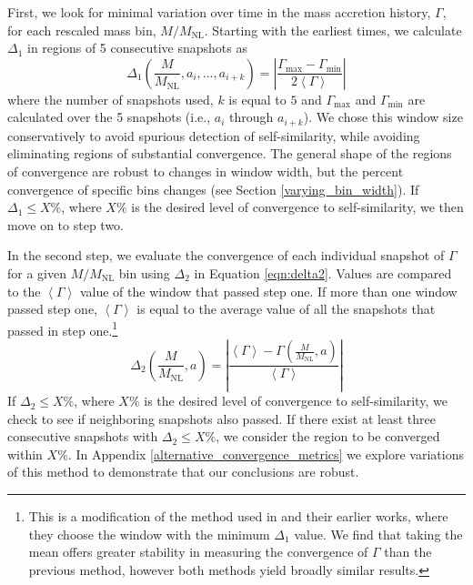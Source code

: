First, we look for minimal variation over time in the mass accretion history, $\Gamma$, for each rescaled mass bin, $M/M_{\mathrm{NL}}$. Starting with the earliest times, we calculate $\Delta_1$ in regions of 5 consecutive snapshots as
\begin{equation}\label{eqn:delta1}
    \Delta_{1}\left(\frac{M}{M_{\mathrm{NL}}}, a_{i}, ..., a_{i+k}\right) = \left|\frac{\Gamma_{\mathrm{max}} - \Gamma_{\mathrm{min}}}{2\left<\Gamma\right>}\right|
\end{equation}
where the number of snapshots used, $k$ is equal to $5$ and $\Gamma_{\mathrm{max}}$ and $\Gamma_{\mathrm{min}}$ are calculated over the 5 snapshots (i.e., $a_{i}$ through $a_{i+k}$). We chose this window size conservatively to avoid spurious detection of self-similarity, while avoiding eliminating regions of substantial convergence. The general shape of the regions of convergence are robust to changes in window width, but the percent convergence of specific bins changes (see Section \ref{varying_bin_width}). If $\Delta_1 \leq X\%$, where $X\%$ is the desired level of convergence to self-similarity, we then move on to step two.

In the second step, we evaluate the convergence of each individual snapshot of $\Gamma$ for a given $M/M_{\mathrm{NL}}$ bin using $\Delta_2$ in Equation \ref{eqn:delta2}. Values are compared to the $\left<\Gamma\right>$ value of the window that passed step one. If more than one window passed step one, $\left<\Gamma\right>$ is equal to the average value of all the snapshots that passed in step one.\footnote{This is a modification of the method used in \cite{Maleubre_2024} and their earlier works, where they choose the window with the minimum $\Delta_1$ value. We find that taking the mean offers greater stability in measuring the convergence of $\Gamma$ than the previous method, however both methods yield broadly similar results.}
\begin{equation}\label{eqn:delta2}
    \Delta_2\left(\frac{M}{M_{\mathrm{NL}}}, a\right) = \left|\frac{\left<\Gamma\right> - \Gamma(\frac{M}{M_{\mathrm{NL}}}, a)}{\left<\Gamma\right>}\right|
\end{equation}
If $\Delta_2 \leq X\%$, where $X\%$ is the desired level of convergence to self-similarity, we check to see if neighboring snapshots also passed. If there exist at least three consecutive snapshots with $\Delta_2 \leq X\%$, we consider the region to be converged within $X\%$. In Appendix \ref{alternative_convergence_metrics} we explore variations of this method to demonstrate that our conclusions are robust.

